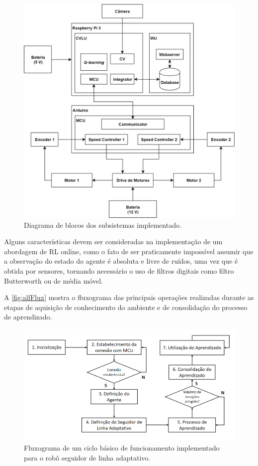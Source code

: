 \documentclass[a4paper]{ifacconf}
\begin{document}
\begin{figure}
\centering 
\caption{Diagrama de blocos dos subsistemas implementado.}
\label{fig:blockDiagramFull}
\includegraphics[scale=0.21]{Figuras/blockDiagramFull.png}
\end{figure}

Alguns características devem ser consideradas na implementação de um abordagem de RL online, como o fato de ser praticamente impossível assumir que a observação do estado do agente é absoluta e livre de ruídos, uma vez que é obtida por sensores, tornando necessário o uso de filtros digitais como filtro Butterworth ou de média móvel. 

A \autoref{fig:alfFlux} mostra o fluxograma das principais operações realizadas durante as etapas de aquisição de conhecimento do ambiente e de consolidação do processo de aprendizado. 

\begin{figure}
\centering 
\caption{Fluxograma de um ciclo básico de funcionamento implementado para o robô seguidor de linha adaptativo.} \label{fig:alfFlux}
\includegraphics[scale=0.30]{Figuras/alfFlux.png}
\end{figure}
\end{document}
